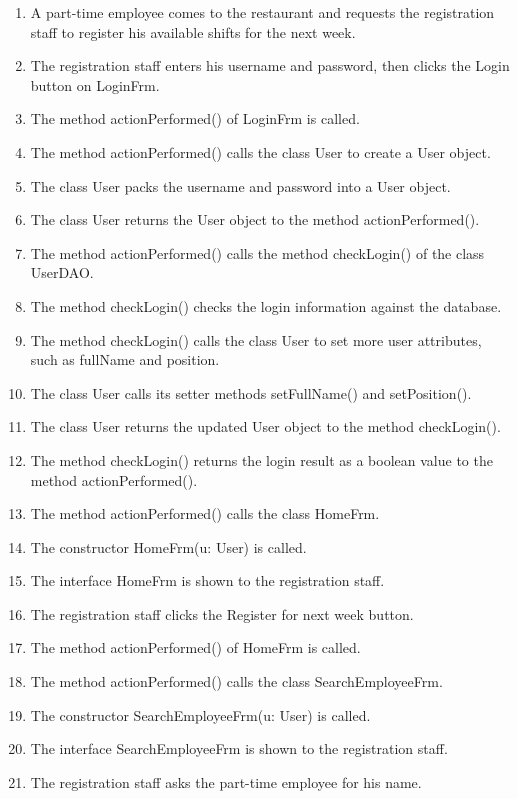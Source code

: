 \begin{enumerate}
    \item A part-time employee comes to the restaurant and requests the registration staff to register his available shifts for the next week.
    \item The registration staff enters his username and password, then clicks the Login button on LoginFrm.
    \item The method actionPerformed() of LoginFrm is called.
    \item The method actionPerformed() calls the class User to create a User object.
    \item The class User packs the username and password into a User object.
    \item The class User returns the User object to the method actionPerformed().
    \item The method actionPerformed() calls the method checkLogin() of the class UserDAO.
    \item The method checkLogin() checks the login information against the database.
    \item The method checkLogin() calls the class User to set more user attributes, such as fullName and position.
    \item The class User calls its setter methods setFullName() and setPosition().
    \item The class User returns the updated User object to the method checkLogin().
    \item The method checkLogin() returns the login result as a boolean value to the method actionPerformed().
    \item The method actionPerformed() calls the class HomeFrm.
    \item The constructor HomeFrm(u: User) is called.
    \item The interface HomeFrm is shown to the registration staff.
    \item The registration staff clicks the Register for next week button.
    \item The method actionPerformed() of HomeFrm is called.
    \item The method actionPerformed() calls the class SearchEmployeeFrm.
    \item The constructor SearchEmployeeFrm(u: User) is called.
    \item The interface SearchEmployeeFrm is shown to the registration staff.
    \item The registration staff asks the part-time employee for his name.

\end{enumerate}
